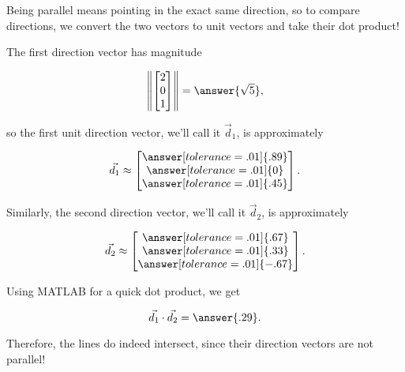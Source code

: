 \documentclass{ximera}
\begin{document}
\begin{example}
  Being parallel means pointing in the exact same direction, so to compare directions, we convert the two vectors to unit vectors and take their dot product!

  The first direction vector has magnitude 
  
  $$\norm{\begin{bmatrix} 2 \\ 0 \\ 1 \end{bmatrix}}=\answer{\sqrt{5}},$$
  
  so the first unit direction vector, we'll call it $\vec{d}_1$, is approximately 

  $$\vec{d_1}\approx\begin{bmatrix}
    \answer[tolerance=.01]{.89}\\\answer[tolerance=.01]{0}\\\answer[tolerance=.01]{.45}
  \end{bmatrix}.$$

  Similarly, the second direction vector, we'll call it $\vec{d}_2$, is approximately

  $$\vec{d_2}\approx\begin{bmatrix}
    \answer[tolerance=.01]{.67}\\\answer[tolerance=.01]{.33}\\\answer[tolerance=.01]{-.67}
  \end{bmatrix}.$$  

  Using MATLAB for a quick dot product, we get 

  $$\vec{d_1}\cdot\vec{d_2}=\answer{.29}.$$

  Therefore, the lines do indeed intersect, since their direction vectors are not parallel!
  

\end{example}
\end{document}
